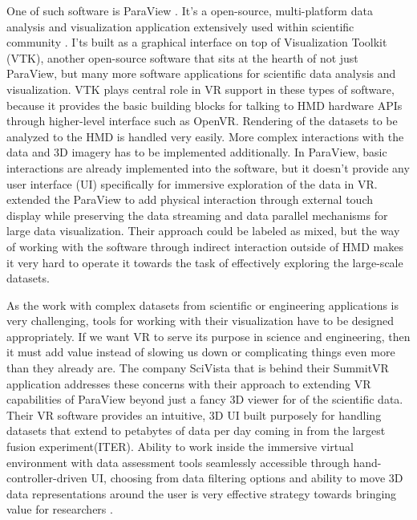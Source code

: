 One of such software is ParaView \citep{paraview2005}. It's a open-source, multi-platform data analysis and visualization application extensively used within scientific community \citep{marionPCLParaViewConnecting2012,ahrensPetascaleVisualizationApproaches2008}. I'ts built as a graphical interface on top of Visualization Toolkit (VTK), another open-source software that sits at the hearth of not just ParaView, but many more software applications for scientific data analysis and visualization. VTK plays central role in VR support in these types of software, because it provides the basic building blocks for talking to HMD hardware APIs through higher-level interface such as OpenVR. Rendering of the datasets to be analyzed to the HMD is handled very easily. More complex interactions with the data and 3D imagery has to be implemented additionally. In ParaView, basic interactions are already implemented into the software, but it doesn't provide any user interface (UI) specifically for immersive exploration of the data in VR. \citep{shettyImmersiveParaViewCommunitybased2011} extended the ParaView to add physical interaction through external touch display while preserving the data streaming and data parallel mechanisms for large data visualization. Their approach could be labeled as mixed, but the way of working with the software through indirect interaction outside of HMD makes it very hard to operate it towards the task of effectively exploring the large-scale datasets. 

As the work with complex datasets from scientific or engineering applications is very challenging, tools for working with their visualization have to be designed appropriately. If we want VR to serve its purpose in science and engineering, then it must add value instead of slowing us down or complicating things even more than they already are. The company SciVista that is behind their SummitVR application addresses these concerns with their approach to extending VR capabilities of ParaView beyond just a fancy 3D viewer for of the scientific data. Their VR software provides an intuitive, 3D UI built purposely for handling datasets that extend to petabytes of data per day coming in from the largest fusion experiment(ITER). Ability to work inside the immersive virtual environment with data assessment tools seamlessly accessible through hand-controller-driven UI, choosing from data filtering options and ability to move 3D data representations around the user is very effective strategy towards bringing value for researchers \citep{summitvr}.

